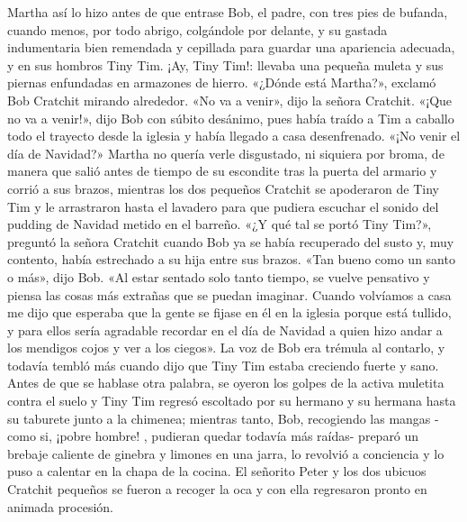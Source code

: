 \documentclass{novela}
\begin{document}
 Martha así lo hizo antes de que entrase Bob, el padre, con tres pies de bufanda, cuando menos, por todo abrigo, colgándole por delante, y su gastada indumentaria bien remendada y cepillada para guardar una apariencia adecuada, y en sus hombros Tiny Tim. ¡Ay, Tiny Tim!: llevaba una pequeña muleta y sus piernas enfundadas en armazones de hierro.
 «¿Dónde está Martha?», exclamó Bob Cratchit mirando alrededor.
 «No va a venir», dijo la señora Cratchit.
 «¡Que no va a venir!», dijo Bob con súbito desánimo, pues había traído a Tim a caballo todo el trayecto desde la iglesia y había llegado a casa desenfrenado. «¡No venir el día de Navidad?»
 Martha no quería verle disgustado, ni siquiera por broma, de manera que salió antes de tiempo de su escondite tras la puerta del armario y corrió a sus brazos, mientras los dos pequeños Cratchit se apoderaron de Tiny Tim y le arrastraron hasta el lavadero para que pudiera escuchar el sonido del pudding de Navidad metido en el barreño.
 «¿Y qué tal se portó Tiny Tim?», preguntó la señora Cratchit cuando Bob ya se había recuperado del susto y, muy contento, había estrechado a su hija entre sus brazos.
 «Tan bueno como un santo o más», dijo Bob. «Al estar sentado solo tanto tiempo, se vuelve pensativo y piensa las cosas más extrañas que se puedan imaginar. Cuando volvíamos a casa me dijo que esperaba que la gente se fijase en él en la iglesia porque está tullido, y para ellos sería agradable recordar en el día de Navidad a quien hizo andar a los mendigos cojos y ver a los ciegos».
 La voz de Bob era trémula al contarlo, y todavía tembló más cuando dijo que Tiny Tim estaba creciendo fuerte y sano.
 Antes de que se hablase otra palabra, se oyeron los golpes de la activa muletita contra el suelo y Tiny Tim regresó escoltado por su hermano y su hermana hasta su taburete junto a la chimenea; mientras tanto, Bob, recogiendo las mangas -como si, ¡pobre hombre! , pudieran quedar todavía más raídas- preparó un brebaje caliente de ginebra y limones en una jarra, lo revolvió a conciencia y lo puso a calentar en la chapa de la cocina. El señorito Peter y los dos ubicuos Cratchit pequeños se fueron a recoger la oca y con ella regresaron pronto en animada procesión.
\end{document}
